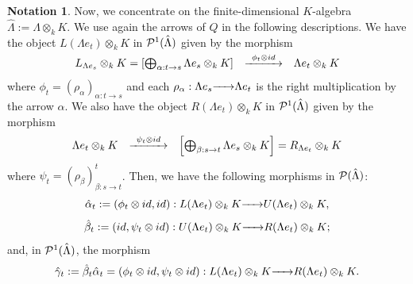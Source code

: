\documentclass{article}
\theoremstyle{definition}
\newtheorem{notation}[theorem]{Notation}
\newcommand{\rightmap}[1]{\smash{\mathop{\hbox to 
20pt{\rightarrowfill}}\limits^{#1}}}
\begin{document}
\begin{notation}\label{R: def alfa, beta, gama para Lambda(otimes)k(x)} Now, we concentrate on  the finite-dimensional $K$-algebra $\hat{\Lambda}:=\Lambda\otimes_kK$.  
  We use again the arrows of $Q$ in the following descriptions.  We have  the object  $L(\Lambda e_t)\otimes_kK$ in ${\cal P}^1(\hat{\Lambda})$  given by the morphism 
$$\begin{matrix}L_{\Lambda e_s}\otimes_k K=\left[\bigoplus_{\alpha:t\rightarrow s }\Lambda e_s\otimes_kK\right]&\rightmap{ \ \ \phi_t\otimes id \ \ }&\Lambda e_t\otimes_kK\end{matrix}$$
where $\phi_t=(\rho_\alpha)_{\alpha:t\rightarrow s}$ and each  $\rho_\alpha:\Lambda e_s\rightmap{}\Lambda e_t$
is the right multiplication by the arrow $\alpha$. 
We also have the object $R(\Lambda e_t)\otimes_kK$  in ${\cal P}^1(\hat{\Lambda})$  given by the morphism 
$$\begin{matrix}\Lambda e_t\otimes_kK&\rightmap{ \  \ \psi_t \otimes id\ \ }&\left[\bigoplus_{\beta:s\rightarrow t} \Lambda e_s\otimes_kK\right]=R_{\Lambda e_t}\otimes_kK\end{matrix}$$
where $\psi_t=(\rho_\beta)^t_{\beta:s\rightarrow t}$.  
Then, we have the following morphisms in ${\cal P}(\hat{\Lambda})$:  
$$\hat{\alpha}_t:=(\phi_t\otimes id,id):L(\Lambda e_t)\otimes_kK\rightmap{}U(\Lambda e_t)\otimes_kK, $$
$$\hat{\beta}_t:=(id,\psi_t\otimes id):U(\Lambda e_t)\otimes_k K\rightmap{}R(\Lambda e_t)\otimes_k K;$$
and, in ${\cal P}^1(\hat{\Lambda})$, the morphism 
$$\hat{\gamma}_t:=\hat{\beta}_t\hat{\alpha}_t=(\phi_t\otimes id,\psi_t\otimes id):L(\Lambda e_t)\otimes_kK\rightmap{}R(\Lambda e_t)\otimes_kK.$$
\end{notation}
\end{document}
